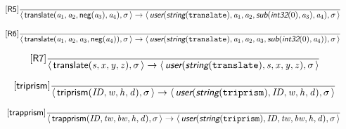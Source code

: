 \documentclass[10pt,leqno]{article}
\newcommand{\artVariable}[1]{\mbox{\em #1\/}}
\newcommand{\artConstructor}[1]{\mbox{\sf #1}}
\newcommand{\artCaseInsensitiveLiteral}[1]{\mbox{\tt #1}}
\newcommand{\artSpecial}[1]{\mbox{\sf\em #1}}
\begin{document}
\begin{equation}
\tag*{[\artConstructor{\sf R5}]}\frac{}{\langle\, \artConstructor{\sf translate}(\artVariable{a$_{1}$}, \artVariable{a$_{2}$}, \artConstructor{\sf neg}(\artVariable{a$_{3}$}), \artVariable{a$_{4}$}), \artVariable{$\sigma$}\,\rangle \rightarrow \langle\, \artSpecial{user}(\artSpecial{string}(\artCaseInsensitiveLiteral{translate}), \artVariable{a$_{1}$}, \artVariable{a$_{2}$}, \artSpecial{sub}(\artSpecial{int32}(0), \artVariable{a$_{3}$}), \artVariable{a$_{4}$}), \artVariable{$\sigma$}\,\rangle }
\end{equation}

\begin{equation}
\tag*{[\artConstructor{\sf R6}]}\frac{}{\langle\, \artConstructor{\sf translate}(\artVariable{a$_{1}$}, \artVariable{a$_{2}$}, \artVariable{a$_{3}$}, \artConstructor{\sf neg}(\artVariable{a$_{4}$})), \artVariable{$\sigma$}\,\rangle \rightarrow \langle\, \artSpecial{user}(\artSpecial{string}(\artCaseInsensitiveLiteral{translate}), \artVariable{a$_{1}$}, \artVariable{a$_{2}$}, \artVariable{a$_{3}$}, \artSpecial{sub}(\artSpecial{int32}(0), \artVariable{a$_{4}$})), \artVariable{$\sigma$}\,\rangle }
\end{equation}

\begin{equation}
\tag*{[\artConstructor{\sf R7}]}\frac{}{\langle\, \artConstructor{\sf translate}(\artVariable{s}, \artVariable{x}, \artVariable{y}, \artVariable{z}), \artVariable{$\sigma$}\,\rangle \rightarrow \langle\, \artSpecial{user}(\artSpecial{string}(\artCaseInsensitiveLiteral{translate}), \artVariable{s}, \artVariable{x}, \artVariable{y}, \artVariable{z}), \artVariable{$\sigma$}\,\rangle }
\end{equation}

\begin{equation}
\tag*{[\artConstructor{\sf triprism}]}\frac{}{\langle\, \artConstructor{\sf triprism}(\artVariable{ID}, \artVariable{w}, \artVariable{h}, \artVariable{d}), \artVariable{$\sigma$}\,\rangle \rightarrow \langle\, \artSpecial{user}(\artSpecial{string}(\artCaseInsensitiveLiteral{triprism}), \artVariable{ID}, \artVariable{w}, \artVariable{h}, \artVariable{d}), \artVariable{$\sigma$}\,\rangle }
\end{equation}

\begin{equation}
\tag*{[\artConstructor{\sf trapprism}]}\frac{}{\langle\, \artConstructor{\sf trapprism}(\artVariable{ID}, \artVariable{tw}, \artVariable{bw}, \artVariable{h}, \artVariable{d}), \artVariable{$\sigma$}\,\rangle \rightarrow \langle\, \artSpecial{user}(\artSpecial{string}(\artCaseInsensitiveLiteral{triprism}), \artVariable{ID}, \artVariable{tw}, \artVariable{bw}, \artVariable{h}, \artVariable{d}), \artVariable{$\sigma$}\,\rangle }
\end{equation}
\end{document}
